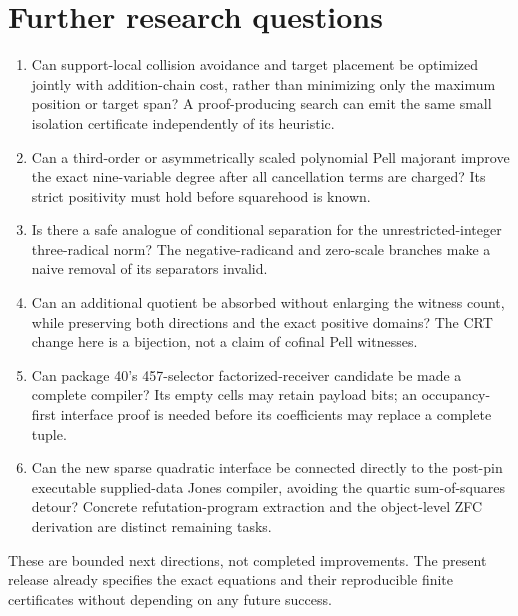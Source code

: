 \documentclass[11pt]{article}
\begin{document}
\section{Further research questions}
\begin{enumerate}
\item Can support-local collision avoidance and target placement be optimized
jointly with addition-chain cost, rather than minimizing only the maximum
position or target span? A proof-producing search can emit the same small
isolation certificate independently of its heuristic.
\item Can a third-order or asymmetrically scaled polynomial Pell majorant
improve the exact nine-variable degree after all cancellation terms are
charged? Its strict positivity must hold before squarehood is known.
\item Is there a safe analogue of conditional separation for the
unrestricted-integer three-radical norm? The negative-radicand and zero-scale
branches make a naive removal of its separators invalid.
\item Can an additional quotient be absorbed without enlarging the witness
count, while preserving both directions and the exact positive domains?
The CRT change here is a bijection, not a claim of cofinal Pell witnesses.
\item Can package 40's 457-selector factorized-receiver candidate be made a
complete compiler? Its empty cells may retain payload bits; an occupancy-first
interface proof is needed before its coefficients may replace a complete tuple.
\item Can the new sparse quadratic interface be connected directly to the
post-pin executable supplied-data Jones compiler, avoiding the quartic
sum-of-squares detour? Concrete refutation-program extraction and the
object-level ZFC derivation are distinct remaining tasks.
\end{enumerate}
These are bounded next directions, not completed improvements. The present
release already specifies the exact equations and their reproducible finite
certificates without depending on any future success.
\end{document}
